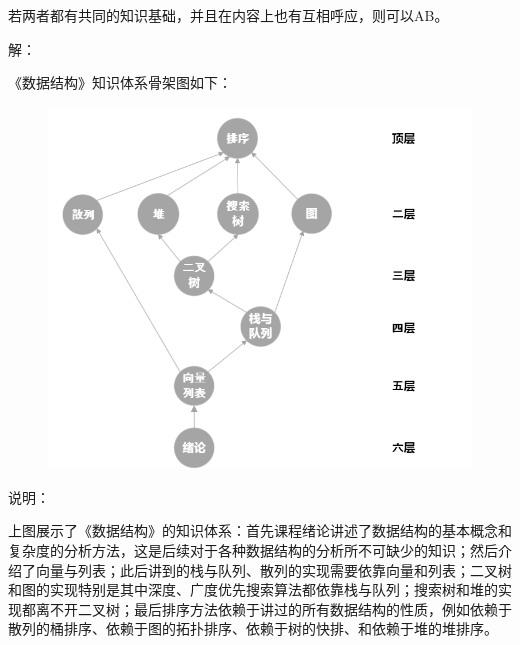 \documentclass[UTF8]{ctexart}
\begin{document}
若两者都有共同的知识基础，并且在内容上也有互相呼应，则可以AB。

\noindent 解：

《数据结构》知识体系骨架图如下：


\begin{figure}[H]
  \centering
  \includegraphics[scale=1]{7.png}
\end{figure}


\noindent 说明：

上图展示了《数据结构》的知识体系：首先课程绪论讲述了数据结构的基本概念和复杂度的分析方法，这是后续对于各种数据结构的分析所不可缺少的知识；然后介绍了向量与列表；此后讲到的栈与队列、散列的实现需要依靠向量和列表；二叉树和图的实现特别是其中深度、广度优先搜索算法都依靠栈与队列；搜索树和堆的实现都离不开二叉树；最后排序方法依赖于讲过的所有数据结构的性质，例如依赖于散列的桶排序、依赖于图的拓扑排序、依赖于树的快排、和依赖于堆的堆排序。
\end{document}
